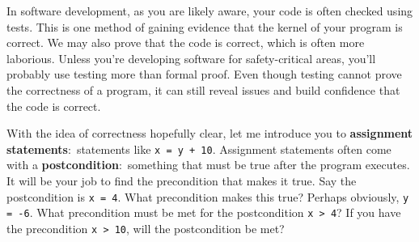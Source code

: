 \documentclass[nobib]{tufte-handout}
\newcommand{\defn}[2]{\noindent\textbf{#1}:\ #2}
\begin{document}
In software development, as you are likely aware, your code is often checked 
using tests. This is one method of gaining evidence that the kernel of your 
program is correct. We may also prove that the code is correct, which is 
often more laborious. Unless you're developing software for safety-critical 
areas, you'll probably use testing more than formal proof. Even though 
testing cannot prove the correctness of a program, it can still reveal issues
and build confidence that the code is correct. 

With the idea of correctness hopefully clear, let me introduce you to 
\defn{assignment statements}{statements like \texttt{x = y + 10}}. 
Assignment statements often come with a \defn{postcondition}{something 
that must be true after the program executes}. It will be your job to find 
the precondition that makes it true. Say the postcondition is 
\texttt{x = 4}. What precondition makes this true? Perhaps obviously, 
\texttt{y = -6}. What precondition must be met for the postcondition 
\texttt{x > 4}? If you have the precondition \texttt{x > 10}, will 
the postcondition be met? 
\end{document}
